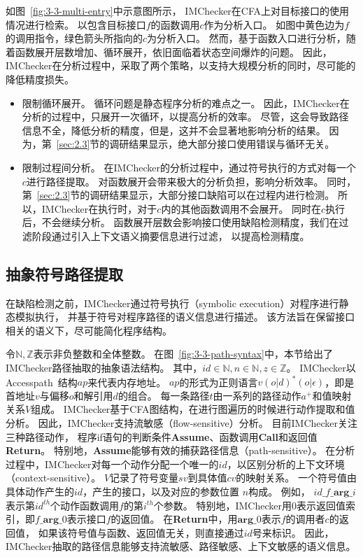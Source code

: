 如图~\ref{fig:3-3-multi-entry}中示意图所示，
IMChecker在CFA上对目标接口的使用情况进行检索。
以包含目标接口$f$的函数调用$c$作为分析入口。
如图中黄色边为$f$的调用指令，绿色箭头所指向的$c$为分析入口。
然而，基于函数入口进行分析，随着函数展开层数增加、循环展开，依旧面临着状态空间爆炸的问题。
因此，IMChecker在分析过程中，采取了两个策略，以支持大规模分析的同时，尽可能的降低精度损失。
\begin{itemize}
	\item 限制循环展开。
	循环问题是静态程序分析的难点之一。
	因此，IMChecker在分析的过程中，只展开一次循环，以提高分析的效率。
	尽管，这会导致路径信息不全，降低分析的精度，但是，这并不会显著地影响分析的结果。
	因为，第~\ref{sec:2.3}节的调研结果显示，绝大部分接口使用错误与循环无关。
	\item 限制过程间分析。
	在IMChecker的分析过程中，通过符号执行的方式对每一个$c$进行路径提取。
	对函数展开会带来极大的分析负担，影响分析效率。
	同时，第~\ref{sec:2.3}节的调研结果显示，大部分接口缺陷可以在过程内进行检测。
	所以，IMChecker在执行时，对于$c$内的其他函数调用不会展开。
	同时在$c$执行后，不会继续分析。
	函数展开层数会影响接口使用缺陷检测精度，我们在过滤阶段通过引入上下文语义摘要信息进行过滤，
	以提高检测精度。
\end{itemize}


\subsection{抽象符号路径提取}
在缺陷检测之前，IMChecker通过符号执行（symbolic execution）对程序进行静态模拟执行，
并基于符号对程序路径的语义信息进行描述。
该方法旨在保留接口相关的语义下，尽可能简化程序结构。



令$\mathbb{N, Z}$表示非负整数和全体整数。
在图~\ref{fig:3-3-path-syntax}中，本节给出了IMChecker路径抽取的抽象语法结构。
其中，$id \in \mathbb{N}, n \in \mathbb{N}, z \in \mathbb{Z}$。
IMChecker以Accesspath~\cite{15-ase-accesspath}结构$ap$来代表内存地址。
$ap$的形式为正则语言$v(o|d)^*(o|\epsilon)$，即是首地址$v$与偏移$o$和解引用$d$的组合。
每一条路径$\mathit{t}$由一系列的路径动作$\mathit{a}^+$和值映射关系$\mathit{V}$组成。
IMChecker基于CFA图结构，在进行图遍历的时候进行动作提取和值分析。
因此，IMChecker支持流敏感（flow-sensitive）分析。
目前IMChecker关注三种路径动作，
程序if语句的判断条件\textbf{Assume}、函数调用\textbf{Call}和返回值\textbf{Return}。
特别地，\textbf{Assume}能够有效的捕获路径信息（path-sensitive）。
在分析过程中，IMChecker对每一个动作分配一个唯一的$id$，以区别分析的上下文环境（context-sensitive）。
$\mathit{V}$记录了符号变量$\mathit{sv}$到具体值$\mathit{cv}$的映射关系。
一个符号值由具体动作产生的$id$，产生的接口，以及对应的参数位置 $\mathit{n}$构成。
例如， $\mathit{id}\_f\_\textbf{arg}\_\mathit{i}$表示第$id^{th}$个动作函数调用$f$的第$\mathit{i}^{th}$个参数。
特别地，IMChecker用0表示返回值索引，即$f\_\textbf{arg}\_0$表示接口$f$的返回值。
在\textbf{Return}中，用$\textbf{arg}\_0$表示$f$的调用者$c$的返回值，
如果该符号值与函数、返回值无关，则直接通过$id$号来标识。
因此，IMChecker抽取的路径信息能够支持流敏感、路径敏感、上下文敏感的语义信息。

